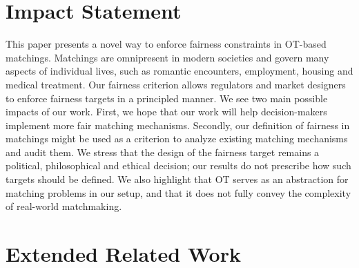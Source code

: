 \documentclass{article}
\theoremstyle{definition}
\begin{document}
\section*{Impact Statement}
This paper presents a novel way to enforce fairness constraints in OT-based matchings. Matchings are omnipresent in modern societies and govern many aspects of individual lives, such as romantic encounters, employment, housing and medical treatment. Our fairness criterion allows regulators and market designers to enforce fairness targets in a principled manner. We see two main possible impacts of our work. First, we hope that our work will help decision-makers implement more fair matching mechanisms. Secondly, our definition of fairness in matchings might be used as a criterion to analyze existing matching mechanisms and audit them. We stress that the design of the fairness target remains a political, philosophical and ethical decision; our results do not prescribe how such targets should be defined. We also highlight that OT serves as an abstraction for matching problems in our setup, and that it does not fully convey the complexity of real-world matchmaking.  


\newpage
\appendix
\onecolumn
\newpage
\appendix
\section{Extended Related Work}
\label{appendix:related_work}
\end{document}
